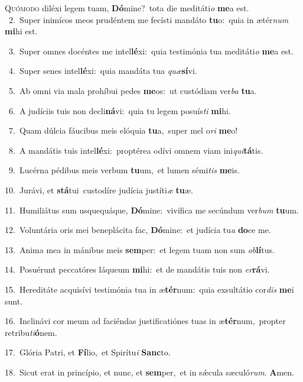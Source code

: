 \lettrine{\initial\textcolor{\initialcolor}{Q}}{uómodo} diléxi legem tuam, \textbf{Dó}\-mine?~\star tota die meditáti\textit{o} \textbf{me}\-a est.\\
{\numbfont\textcolor{\numbcolor}{~2.}}~Super inimícos meos prudéntem me fecísti mandáto \textbf{tu}\-o:~\star quia in ætér\textit{num} \textbf{mi}\-hi est.\par
{\numbfont\textcolor{\numbcolor}{~3.}}~Super omnes docéntes me intel\-\textbf{lé}\-xi:~\star quia testimónia tua meditáti\textit{o} \textbf{me}\-a est.\par
{\numbfont\textcolor{\numbcolor}{~4.}}~Super senes intel\-\textbf{lé}\-xi:~\star quia mandáta tua \textit{quæ}\-\textbf{sí}vi.\par
{\numbfont\textcolor{\numbcolor}{~5.}}~Ab omni via mala prohíbui pedes \textbf{me}\-os:~\star ut custódiam ver\textit{ba} \textbf{tu}\-a.\par
{\numbfont\textcolor{\numbcolor}{~6.}}~A judíciis tuis non decli\-\textbf{ná}\-vi:~\star quia tu legem posuís\textit{ti} \textbf{mi}\-hi.\par
{\numbfont\textcolor{\numbcolor}{~7.}}~Quam dúlcia fáucibus meis elóquia \textbf{tu}\-a,~\star super mel o\textit{ri} \textbf{me}\-o!\par
{\numbfont\textcolor{\numbcolor}{~8.}}~A mandátis tuis intel\-\textbf{lé}\-xi:~\star proptérea odívi omnem viam ini\-\textit{qui}\-\textbf{tá}tis.\par
{\numbfont\textcolor{\numbcolor}{~9.}}~Lucérna pédibus meis verbum \textbf{tu}\-um,~\star et lumen sémi\textit{tis} \textbf{me}\-is.\par
{\numbfont\textcolor{\numbcolor}{10.}}~Jurávi, et \textbf{stá}\-tui~\star custodíre judícia justíti\textit{æ} \textbf{tu}\-æ.\par
{\numbfont\textcolor{\numbcolor}{11.}}~Humiliátus sum usquequáque, \textbf{Dó}\-mine:~\star vivífica me secúndum ver\textit{bum} \textbf{tu}\-um.\par
{\numbfont\textcolor{\numbcolor}{12.}}~Voluntária oris mei beneplácita fac, \textbf{Dó}\-mine:~\star et judícia tu\textit{a} \textbf{do}\-ce me.\par
{\numbfont\textcolor{\numbcolor}{13.}}~Anima mea in mánibus meis \textbf{sem}\-per:~\star et legem tuam non sum \textit{ob}\-\textbf{lí}tus.\par
{\numbfont\textcolor{\numbcolor}{14.}}~Posuérunt peccatóres láqueum \textbf{mi}\-hi:~\star et de mandátis tuis non \textit{er}\-\textbf{rá}vi.\par
{\numbfont\textcolor{\numbcolor}{15.}}~Hereditáte acquisívi testimónia tua in æ\-\textbf{tér}\-num:~\star quia exsultátio cor\textit{dis} \textbf{me}\-i sunt.\par
{\numbfont\textcolor{\numbcolor}{16.}}~Inclinávi cor meum ad faciéndas justificatiónes tuas in æ\-\textbf{tér}\-num,~\star propter retribu\-\textit{ti}\-\textbf{ó}nem.\par
{\numbfont\textcolor{\numbcolor}{17.}}~Glória Patri, et \textbf{Fí}\-lio,~\star et Spirítu\textit{i} \textbf{Sanc}\-to.\par
{\numbfont\textcolor{\numbcolor}{18.}}~Sicut erat in princípio, et nunc, et \textbf{sem}\-per,~\star et in sǽcula sæculó\-\textit{rum}\-. \textbf{A}\-men.\par
